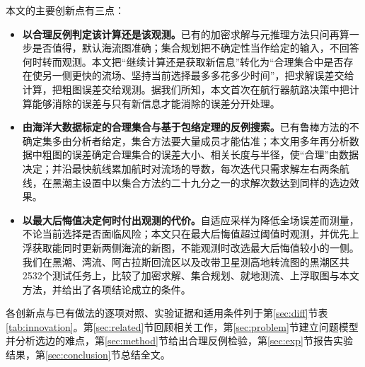 本文的主要创新点有三点：
\begin{itemize}
\item \textbf{以合理反例判定该计算还是该观测。}已有的加密求解与元推理方法只问再算一步是否值得，默认海流图准确；集合规划把不确定性当作给定的输入，不回答何时转而观测。本文把“继续计算还是获取新信息”转化为“合理集合中是否存在使另一侧更快的流场、坚持当前选择最多多花多少时间”，把求解误差交给计算，把粗图误差交给观测。据我们所知，本文首次在航行器航路决策中把计算能够消除的误差与只有新信息才能消除的误差分开处理。
\item \textbf{由海洋大数据标定的合理集合与基于包络定理的反例搜索。}已有鲁棒方法的不确定集多由分析者给定，集合方法要大量成员才能估准；本文用多年再分析数据中粗图的误差确定合理集合的误差大小、相关长度与半径，使“合理”由数据决定；并沿最快航线累加航时对流场的导数，每次迭代只需求解左右两条航线，在黑潮主设置中以集合方法约二十九分之一的求解次数达到同样的选边效果。
\item \textbf{以最大后悔值决定何时付出观测的代价。}自适应采样为降低全场误差而测量，不论当前选择是否面临风险；本文只在最大后悔值超过阈值时观测，并优先上浮获取能同时更新两侧海流的新图，不能观测时改选最大后悔值较小的一侧。我们在黑潮、湾流、阿古拉斯回流区以及改带卫星测高地转流图的黑潮区共2532个测试任务上，比较了加密求解、集合规划、就地测流、上浮取图与本文方法，并给出了各项结论成立的条件。
\end{itemize}
各创新点与已有做法的逐项对照、实验证据和适用条件列于第\ref{sec:diff}节表\ref{tab:innovation}。第\ref{sec:related}节回顾相关工作，第\ref{sec:problem}节建立问题模型并分析选边的难点，第\ref{sec:method}节给出合理反例检验，第\ref{sec:exp}节报告实验结果，第\ref{sec:conclusion}节总结全文。

